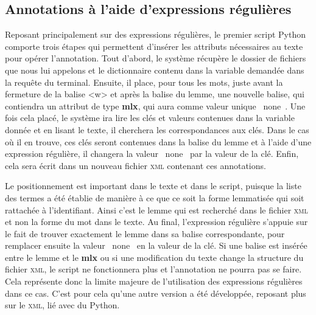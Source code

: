 \subsection{Annotations à l'aide d'expressions régulières}
Reposant principalement sur des expressions régulières, le premier script Python comporte trois étapes qui permettent d'insérer les attributs nécessaires au texte pour opérer l'annotation. Tout d'abord, le système récupère le dossier de fichiers que nous lui appelons et le dictionnaire contenu dans la variable demandée dans la requête du terminal. Ensuite, il place, pour tous les mots, juste avant la fermeture de la balise <w> et après la balise du lemme, une nouvelle balise, qui contiendra un attribut de type \textbf{mlx}, qui aura comme valeur unique \og~none~\fg{}. Une fois cela placé, le système ira lire les clés et valeurs contenues dans la variable donnée et en lisant le texte, il cherchera les correspondances aux clés. Dans le cas où il en trouve, ces clés seront contenues dans la balise du lemme et à l'aide d'une expression régulière, il changera la valeur \og~none~\fg{} par la valeur de la clé. Enfin, cela sera écrit dans un nouveau fichier \textsc{xml} contenant ces annotations.

Le positionnement est important dans le texte et dans le script, puisque la liste des termes a été établie de manière à ce que ce soit la forme lemmatisée qui soit rattachée à l'identifiant. Ainsi c'est le lemme qui est recherché dans le fichier \textsc{xml} et non la forme du mot dans le texte. Au final, l'expression régulière s'appuie sur le fait de trouver exactement le lemme dans sa balise correspondante, pour remplacer ensuite la valeur \og~none~\fg{} en la valeur de la clé. Si une balise est insérée entre le lemme et le \textbf{mlx} ou si une modification du texte change la structure du fichier \textsc{xml}, le script ne fonctionnera plus et l'annotation ne pourra pas se faire. Cela représente donc la limite majeure de l'utilisation des expressions régulières dans ce cas. C'est pour cela qu'une autre version a été développée, reposant plus sur le \textsc{xml}, lié avec du Python.


